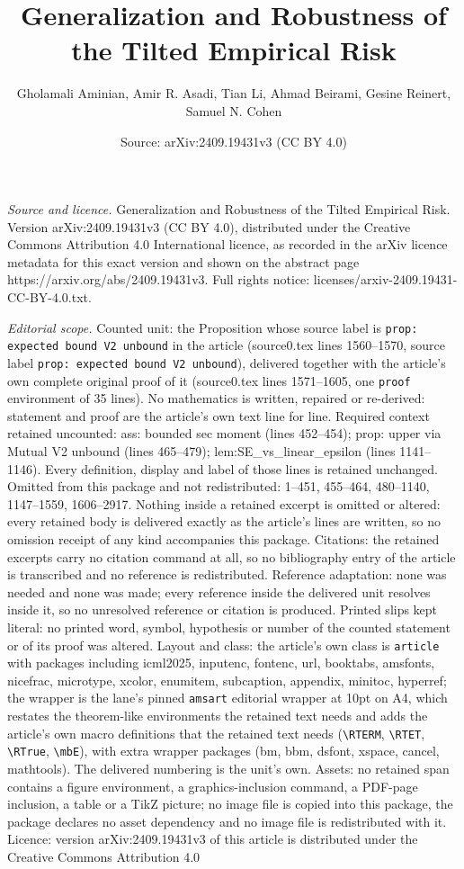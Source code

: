 \documentclass[10pt,a4paper]{amsart}
\title[Generalization and Robustness of the Tilted Empirical Risk]{Generalization and Robustness of the Tilted Empirical Risk}
\author{Gholamali Aminian, Amir R. Asadi, Tian Li, Ahmad Beirami, Gesine Reinert, Samuel N. Cohen}
\date{Source: arXiv:2409.19431v3 (CC BY 4.0)}
\begin{document}
\maketitle

\noindent\emph{Source and licence.} Generalization and Robustness of the Tilted Empirical Risk. Version arXiv:2409.19431v3 (CC BY 4.0), distributed under the Creative Commons Attribution 4.0 International licence, as recorded in the arXiv licence metadata for this exact version and shown on the abstract page https://arxiv.org/abs/2409.19431v3. Full rights notice: licenses/arxiv-2409.19431-CC-BY-4.0.txt.\par\smallskip

\noindent\textit{Editorial scope.} Counted unit: the Proposition whose source label is \texttt{prop: expected bound V2 unbound} in the article (source0.tex lines 1560--1570, source label \texttt{prop: expected bound V2 unbound}), delivered together with the article's own complete original proof of it (source0.tex lines 1571--1605, one \texttt{proof} environment of 35 lines). No mathematics is written, repaired or re-derived: statement and proof are the article's own text line for line. Required context retained uncounted: ass: bounded sec moment (lines 452--454); prop: upper via Mutual V2 unbound (lines 465--479); lem:SE\_vs\_linear\_epsilon (lines 1141--1146). Every definition, display and label of those lines is retained unchanged. Omitted from this package and not redistributed: 1--451, 455--464, 480--1140, 1147--1559, 1606--2917. Nothing inside a retained excerpt is omitted or altered: every retained body is delivered exactly as the article's lines are written, so no omission receipt of any kind accompanies this package. Citations: the retained excerpts carry no citation command at all, so no bibliography entry of the article is transcribed and no reference is redistributed. Reference adaptation: none was needed and none was made; every reference inside the delivered unit resolves inside it, so no unresolved reference or citation is produced. Printed slips kept literal: no printed word, symbol, hypothesis or number of the counted statement or of its proof was altered. Layout and class: the article's own class is \texttt{article} with packages including icml2025, inputenc, fontenc, url, booktabs, amsfonts, nicefrac, microtype, xcolor, enumitem, subcaption, appendix, minitoc, hyperref; the wrapper is the lane's pinned \texttt{amsart} editorial wrapper at 10pt on A4, which restates the theorem-like environments the retained text needs and adds the article's own macro definitions that the retained text needs (\texttt{\textbackslash RTERM}, \texttt{\textbackslash RTET}, \texttt{\textbackslash RTrue}, \texttt{\textbackslash mbE}), with extra wrapper packages (bm, bbm, dsfont, xspace, cancel, mathtools). The delivered numbering is the unit's own. Assets: no retained span contains a figure environment, a graphics-inclusion command, a PDF-page inclusion, a table or a TikZ picture; no image file is copied into this package, the package declares no asset dependency and no image file is redistributed with it. Licence: version arXiv:2409.19431v3 of this article is distributed under the Creative Commons Attribution 4.0 
\end{document}
